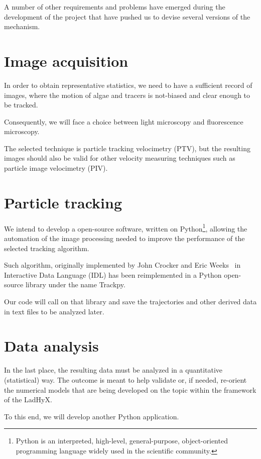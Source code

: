 A number of other requirements and problems have emerged during the development of the project that have pushed us to devise several versions of the mechanism.

\section{Image acquisition}

In order to obtain representative statistics, we need to have a sufficient record of images, where the motion of algae and tracers is not-biased and clear enough to be tracked.

Consequently, we will face a choice between light microscopy and fluorescence microscopy.

The selected technique is particle tracking velocimetry (PTV), but the resulting images should also be valid for other velocity measuring techniques such as particle image velocimetry (PIV).

\section{Particle tracking}

We intend to develop a open-source software, written on Python\footnote{Python is an interpreted, high-level, general-purpose, object-oriented programming language widely used in the scientific community.}, allowing the automation of the image processing needed to improve the performance of the selected tracking algorithm.

Such algorithm, originally implemented by John Crocker and Eric Weeks~\cite{Crocker} in Interactive Data Language (IDL) has been reimplemented in a Python open-source library under the name Trackpy.

Our code will call on that library and save the trajectories and other derived data in text files to be analyzed later. 

\section{Data analysis}

In the last place, the resulting data must be analyzed in a quantitative (statistical) way. The outcome is meant to help validate or, if needed, re-orient the numerical models that are being developed on the topic within the framework of the LadHyX.

To this end, we will develop another Python application.

